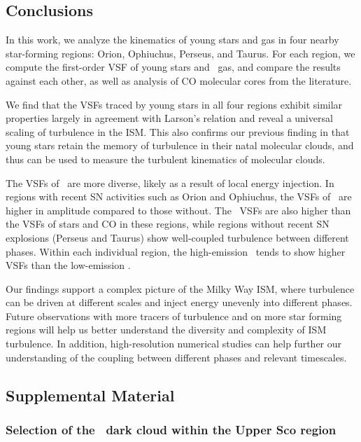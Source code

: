 \subsection{Conclusions} \label{sec:conclusions}

In this work, we analyze the kinematics of young stars and gas in four nearby star-forming regions: Orion, Ophiuchus, Perseus, and Taurus. For each region, we compute the first-order VSF of young stars and \halpha~gas, and compare the results against each other, as well as analysis of CO molecular cores from the literature.

We find that the VSFs traced by young stars in all four regions exhibit similar properties largely in agreement with Larson's relation and reveal a universal scaling of turbulence in the ISM\@. This also confirms our previous finding in \citet[][]{ha_measuring_2021} that young stars retain the memory of turbulence in their natal molecular clouds, and thus can be used to measure the turbulent kinematics of molecular clouds.

The VSFs of \halpha~are more diverse, likely as a result of local energy injection. In regions with recent SN activities such as Orion and Ophiuchus, the VSFs of \halpha~are higher in amplitude compared to those without. The \halpha~VSFs are also higher than the VSFs of stars and CO in these regions, while regions without recent SN explosions (Perseus and Taurus) show well-coupled turbulence between different phases. Within each individual region, the high-emission \halpha~tends to show higher VSFs than the low-emission \halpha.

Our findings support a complex picture of the Milky Way ISM, where turbulence can be driven at different scales and inject energy unevenly into different phases. Future observations with more tracers of turbulence and on more star forming regions will help us better understand the diversity and complexity of ISM turbulence. In addition, high-resolution numerical studies can help further our understanding of the coupling between different phases and relevant timescales.


\subsection{Supplemental Material}

\subsubsection{Selection of the \texorpdfstring{\rophi}{rho Oph}~dark cloud within the Upper Sco region}
\label{sec:Upper_Sco}

